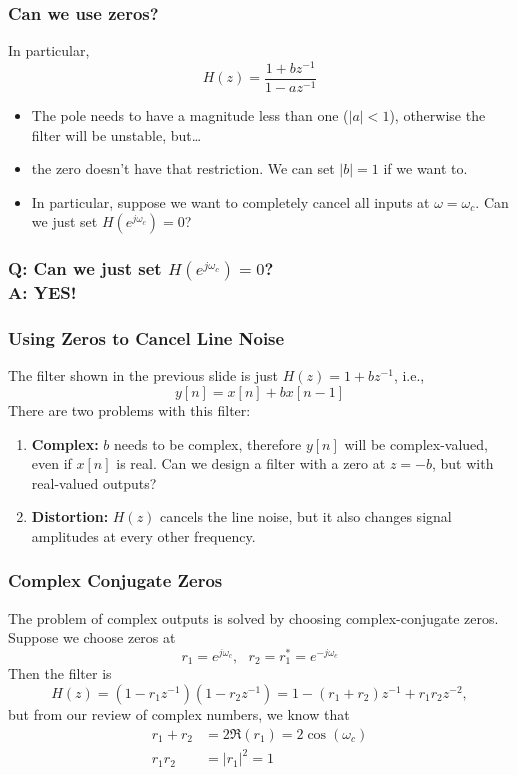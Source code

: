 \documentclass{beamer}
\begin{document}
\begin{frame}
  \frametitle{Can we use zeros?}

  In particular,
  \[
  H(z)  = \frac{1+bz^{-1}}{1-az^{-1}}
  \]
  \begin{itemize}
  \item The pole needs to have a magnitude less than one ($|a|<1$),
    otherwise the filter will be unstable, but\ldots
  \item the zero doesn't have that restriction.  We can set $|b|=1$ if we want to.
  \item In particular, suppose we want to completely cancel all inputs
    at $\omega=\omega_c$.  Can we just set $H(e^{j\omega_c})=0$?
  \end{itemize}
\end{frame}

\begin{frame}
  \frametitle{{\bf Q}: Can we just set $H(e^{j\omega_c})=0$?\\{\bf A: YES!}}
  \centerline{}
\end{frame}  

\begin{frame}
  \frametitle{Using Zeros to Cancel Line Noise}
  The filter shown in the previous slide is just $H(z)=1+bz^{-1}$, i.e.,
  \begin{displaymath}
    y[n] = x[n] + bx[n-1]
  \end{displaymath}
  There are two problems with this filter:
  \begin{enumerate}
  \item {\bf Complex:} $b$ needs to be complex, therefore $y[n]$ will
    be complex-valued, even if $x[n]$ is real.  Can we design a filter
    with a zero at $z=-b$, but with real-valued outputs?
  \item {\bf Distortion:} $H(z)$ cancels the line noise, but it also
    changes signal amplitudes at every other frequency.
  \end{enumerate}
\end{frame}

\begin{frame}
  \frametitle{Complex Conjugate Zeros}

  The problem of complex outputs is solved by choosing
  complex-conjugate zeros.  Suppose we choose zeros at
  \begin{displaymath}
    r_1 = e^{j\omega_c},~~~r_2=r_1^*=e^{-j\omega_c}
  \end{displaymath}
  Then the filter is
  \begin{displaymath}
    H(z) = (1-r_1z^{-1})(1-r_2z^{-1}) = 1-(r_1+r_2)z^{-1} + r_1r_2z^{-2},
  \end{displaymath}
  but from our review of complex numbers, we know that
  \begin{align*}
    r_1+r_2 &= 2\Re(r_1) = 2\cos(\omega_c)\\
    r_1r_2 &= |r_1|^2 = 1
  \end{align*}
\end{frame}
\end{document}
